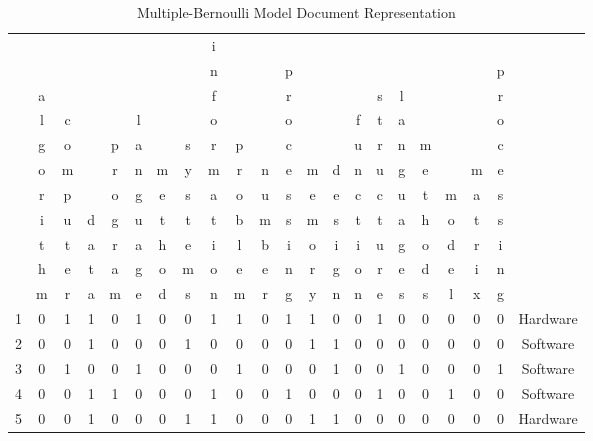 \begin{table}[!ht]
	\caption{Multiple-Bernoulli Model Document Representation} \label{tab:bernoulli-estimate}
	\begin{center}
	\begin{scriptsize}
	\setlength\tabcolsep{1.5pt}
		\begin{tabular}{cccccccccccccccccccccc}	
 &   &   &   &   &   &   &   & i &   &   &   &   &   &   &   &   &   &   &   &   & \\
 &   &   &   &   &   &   &   & n &   &   & p &   &   &   &   &   &   &   &   & p & \\
 & a &   &   &   &   &   &   & f &   &   & r &   &   &   & s & l &   &   &   & r & \\
 & l & c &   &   & l &   &   & o &   &   & o &   &   & f & t & a &   &   &   & o & \\
 & g & o &   & p & a &   & s & r & p &   & c &   &   & u & r & n & m &   &   & c & \\
 & o & m &   & r & n & m & y & m & r & n & e & m & d & n & u & g & e &   & m & e & \\
 & r & p &   & o & g & e & s & a & o & u & s & e & e & c & c & u & t & m & a & s & \\
 & i & u & d & g & u & t & t & t & b & m & s & m & s & t & t & a & h & o & t & s & \\
 & t & t & a & r & a & h & e & i & l & b & i & o & i & i & u & g & o & d & r & i & \\
 & h & e & t & a & g & o & m & o & e & e & n & r & g & o & r & e & d & e & i & n & \\
 & m & r & a & m & e & d & s & n & m & r & g & y & n & n & e & s & s & l & x & g & \\
     			\midrule	
1 & 0 & 1 & 1 & 0 & 1 & 0 & 0 & 1 & 1 & 0 & 1 & 1 & 0 & 0 & 1 & 0 & 0 & 0 & 0 & 0 & Hardware\\
2 & 0 & 0 & 1 & 0 & 0 & 0 & 1 & 0 & 0 & 0 & 0 & 1 & 1 & 0 & 0 & 0 & 0 & 0 & 0 & 0 & Software\\
3 & 0 & 1 & 0 & 0 & 1 & 0 & 0 & 0 & 1 & 0 & 0 & 0 & 1 & 0 & 0 & 1 & 0 & 0 & 0 & 1 & Software\\
4 & 0 & 0 & 1 & 1 & 0 & 0 & 0 & 1 & 0 & 0 & 1 & 0 & 0 & 0 & 1 & 0 & 0 & 1 & 0 & 0 & Software\\
5 & 0 & 0 & 1 & 0 & 0 & 0 & 1 & 1 & 0 & 0 & 0 & 1 & 1 & 0 & 0 & 0 & 0 & 0 & 0 & 0 & Hardware\\

\end{tabular}
\end{scriptsize}
\end{center}
\end{table}
